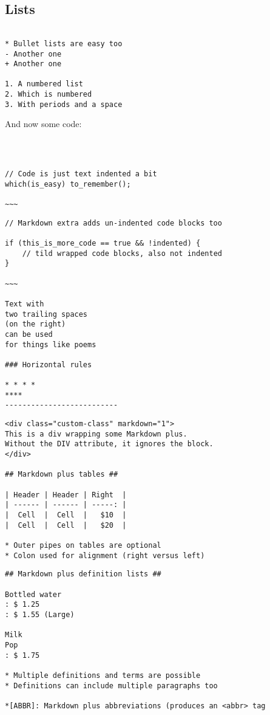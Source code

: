 \documentclass[]{article}
\begin{document}
\subsection*{Lists}
\begin{framed}
	\begin{verbatim}
	
* Bullet lists are easy too
- Another one
+ Another one

1. A numbered list
2. Which is numbered
3. With periods and a space
\end{verbatim}
\end{framed}
And now some code:
\begin{framed}
	\begin{verbatim}
	


// Code is just text indented a bit
which(is_easy) to_remember();

~~~
\end{verbatim}
\end{framed}
\begin{framed}
	\begin{verbatim}
// Markdown extra adds un-indented code blocks too

if (this_is_more_code == true && !indented) {
	// tild wrapped code blocks, also not indented
}

~~~

Text with  
two trailing spaces  
(on the right)  
can be used  
for things like poems  

### Horizontal rules

* * * *
****
--------------------------
\end{verbatim}
\end{framed}

\newpage
\begin{framed}
\begin{verbatim}
<div class="custom-class" markdown="1">
This is a div wrapping some Markdown plus.  
Without the DIV attribute, it ignores the block. 
</div>

## Markdown plus tables ##

| Header | Header | Right  |
| ------ | ------ | -----: |
|  Cell  |  Cell  |   $10  |
|  Cell  |  Cell  |   $20  |

* Outer pipes on tables are optional
* Colon used for alignment (right versus left)
\end{verbatim}
\end{framed}
\newpage
\begin{framed}
	\begin{verbatim}
## Markdown plus definition lists ##

Bottled water
: $ 1.25
: $ 1.55 (Large)

Milk
Pop
: $ 1.75

* Multiple definitions and terms are possible
* Definitions can include multiple paragraphs too

*[ABBR]: Markdown plus abbreviations (produces an <abbr> tag
\end{verbatim}
\end{framed}
\end{document}
